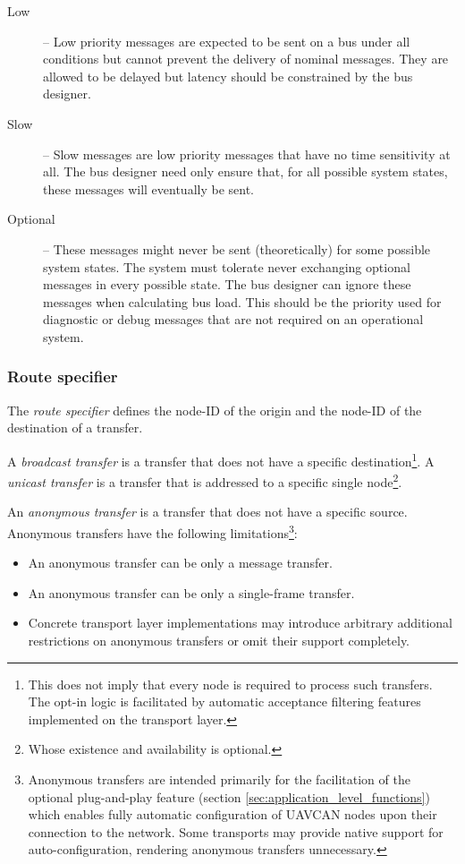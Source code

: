 \begin{remark}[breakable]
\begin{description}
        \item[Low] -- Low priority messages are expected to be sent on a bus under all conditions but cannot
        prevent the delivery of nominal messages.
        They are allowed to be delayed but latency should be constrained by the bus designer.

        \item[Slow] -- Slow messages are low priority messages that have no time sensitivity at all.
        The bus designer need only ensure that, for all possible system states,
        these messages will eventually be sent.

        \item[Optional] -- These messages might never be sent (theoretically) for some possible system states.
        The system must tolerate never exchanging optional messages in every possible state.
        The bus designer can ignore these messages when calculating bus load.
        This should be the priority used for diagnostic or debug messages that are not required on an
        operational system.
    \end{description}
\end{remark}

\subsubsection{Route specifier}\label{sec:transport_route_specifier}

The \emph{route specifier} defines the node-ID of the origin and the node-ID of the destination of a transfer.

A \emph{broadcast transfer} is a transfer that does not have a specific destination\footnote{%
    This does not imply that every node is required to process such transfers.
    The opt-in logic is facilitated by automatic acceptance filtering features implemented on the transport layer.
}.
A \emph{unicast transfer} is a transfer that is addressed to a specific single node\footnote{%
    Whose existence and availability is optional.
}.

An \emph{anonymous transfer} is a transfer that does not have a specific source.
Anonymous transfers have the following limitations\footnote{%
    Anonymous transfers are intended primarily for the facilitation of the optional plug-and-play feature
    (section \ref{sec:application_level_functions})
    which enables fully automatic configuration of UAVCAN nodes upon their connection to the network.
    Some transports may provide native support for auto-configuration, rendering anonymous transfers unnecessary.
}:
\begin{itemize}
    \item An anonymous transfer can be only a message transfer.
    \item An anonymous transfer can be only a single-frame transfer.
    \item Concrete transport layer implementations may introduce arbitrary additional restrictions
          on anonymous transfers or omit their support completely.
\end{itemize}

